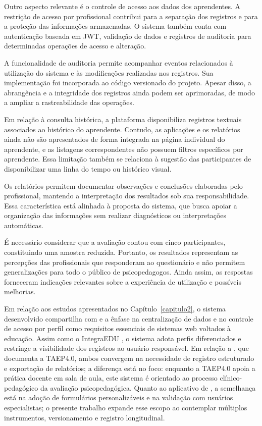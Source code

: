 Outro aspecto relevante é o controle de acesso aos dados dos aprendentes. A restrição de acesso por profissional contribui para a separação dos registros e para a proteção das informações armazenadas. O sistema também conta com autenticação baseada em JWT, validação de dados e registros de auditoria para determinadas operações de acesso e alteração.

A funcionalidade de auditoria permite acompanhar eventos relacionados à utilização do sistema e às modificações realizadas nos registros. Sua implementação foi incorporada ao código versionado do projeto. Apesar disso, a abrangência e a integridade dos registros ainda podem ser aprimoradas, de modo a ampliar a rastreabilidade das operações.

Em relação à consulta histórica, a plataforma disponibiliza registros textuais associados ao histórico do aprendente. Contudo, as aplicações e os relatórios ainda não são apresentados de forma integrada na página individual do aprendente, e as listagens correspondentes não possuem filtros específicos por aprendente. Essa limitação também se relaciona à sugestão das participantes de disponibilizar uma linha do tempo ou histórico visual.

Os relatórios permitem documentar observações e conclusões elaboradas pelo profissional, mantendo a interpretação dos resultados sob sua responsabilidade. Essa característica está alinhada à proposta do sistema, que busca apoiar a organização das informações sem realizar diagnósticos ou interpretações automáticas.

É necessário considerar que a avaliação contou com cinco participantes, constituindo uma amostra reduzida. Portanto, os resultados representam as percepções das profissionais que responderam ao questionário e não permitem generalizações para todo o público de psicopedagogos. Ainda assim, as respostas forneceram indicações relevantes sobre a experiência de utilização e possíveis melhorias.

Em relação aos estudos apresentados no Capítulo~\ref{capitulo2}, o sistema desenvolvido compartilha com  e  a ênfase na centralização de dados e no controle de acesso por perfil como requisitos essenciais de sistemas web voltados à educação. Assim como o IntegraEDU \cite{pedroso2025_integraedu}, o sistema adota perfis diferenciados e restringe a visibilidade dos registros ao usuário responsável. Em relação a , que documenta a TAEP4.0, ambos convergem na necessidade de registro estruturado e exportação de relatórios; a diferença está no foco: enquanto a TAEP4.0 apoia a prática docente em sala de aula, este sistema é orientado ao processo clínico-pedagógico da avaliação psicopedagógica. Quanto ao aplicativo de , a semelhança está na adoção de formulários personalizáveis e na validação com usuários especialistas; o presente trabalho expande esse escopo ao contemplar múltiplos instrumentos, versionamento e registro longitudinal.

